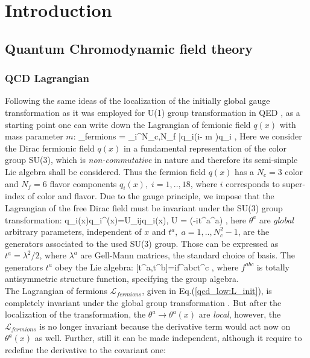 \chapter{Introduction}
\label{chap:QCD_low}

\section{Quantum Chromodynamic field theory}
	\subsection*{QCD Lagrangian}
	Following the same ideas of the localization of the initially global gauge transformation as it was employed for U(1) group transformation in QED \cite{opac-b1131978}, as a starting point one can write down the Lagrangian of femionic field $q(x)$ with mass parameter $m$:
	\beqa
		_{fermions} = \sum_i^{N_c,N_f} \bar{q}_i(i\dslash - m )q_i \;,
		\label{qcd_low:L_init}
	\eeqa
	Here we consider the Dirac fermionic field $q(x)$ in a fundamental representation of the color group SU(3), which is \textit{non-commutative} in nature and therefore  its semi-simple Lie algebra shall be considered. Thus the fermion field $q(x)$ has a $N_c=3$ color and $N_f=6$ flavor components $q_i(x), \; i=1,..,18$, where $i$ corresponds to super-index of color and flavor. Due to the gauge principle, we impose that the Lagrangian of the free Dirac field must be invariant under the SU(3) group transformation:
	\beqa
		\label{qcd_low:color_transform_ferm}
		q_i(x)\rightarrow  q_i^\prime(x)=U_{ij}q_i(x), \;\; U = (-it^a\theta^a) \;,
	\eeqa
	here $\theta^a$ are \textit{global} arbitrary parameters, independent of $x$ and $t^a, \; a=1,..,N^2_c-1$, are the generators associated to the used SU(3) group. Those can be expressed as $t^a=\lambda^2/2$, where $\lambda^a$ are Gell-Mann matrices, the standard choice of basis. The generators $t^a$ obey the Lie algebra:
	\beqa
		\label{qcd_low:commut_relation}
		[t^a,t^b]=if^{abc}t^c \;,
	\eeqa
	where $f^{abc}$ is totally antisymmetric structure function, specifying the group algebra. 
	\\
	The Lagrangian of fermions $\mathcal{L}_{fermions}$, given in Eq.(\ref{qcd_low:L_init}), is completely invariant under the global group transformation \Eq{\ref{qcd_low:color_transform_ferm}}. But after the localization of the transformation, the $\theta^a\rightarrow \theta^a(x)$ are \textit{local}, however, the $\mathcal{L}_{fermions}$ is no longer invariant because the derivative term would act now on $\theta^a(x)$ as well. Further, still it can be made independent, although it require to redefine the derivative to the covariant one:
